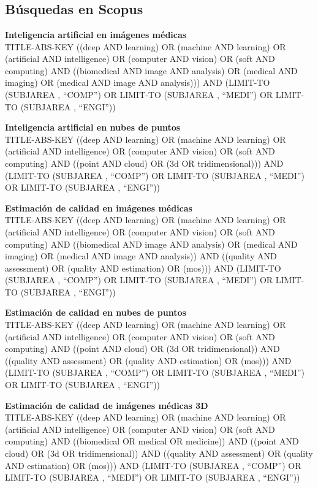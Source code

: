 \chapter*{}
\section*{Búsquedas en Scopus}
\label{subs:Scopus}
\begin{enumerate}
\item 
{\footnotesize
  \textbf{Inteligencia artificial en imágenes médicas}\\\hfill
 TITLE-ABS-KEY ((deep AND learning) OR (machine AND learning) 
 OR (artificial AND intelligence) OR (computer AND vision) 
 OR (soft AND computing) AND ((biomedical AND image AND analysis) 
 OR (medical AND imaging) OR (medical AND image AND analysis))) 
 AND (LIMIT-TO (SUBJAREA , ``COMP'') OR LIMIT-TO (SUBJAREA , ``MEDI'') 
OR LIMIT-TO (SUBJAREA , ``ENGI''))
}
{\footnotesize
 \item \textbf{Inteligencia artificial en nubes de puntos}\\\hfill
 TITLE-ABS-KEY ((deep AND learning) OR (machine AND learning) OR (artificial AND intelligence) OR (computer AND vision) OR (soft AND computing) AND ((point AND cloud) OR (3d OR tridimensional))) AND (LIMIT-TO (SUBJAREA , ``COMP'') OR LIMIT-TO (SUBJAREA , ``MEDI'') OR LIMIT-TO (SUBJAREA , ``ENGI''))
}
{\footnotesize
 \item \textbf{Estimación de calidad en imágenes médicas}\\\hfill
 TITLE-ABS-KEY ((deep AND learning) OR (machine AND learning) OR (artificial AND intelligence) OR (computer AND vision) OR (soft AND computing) AND ((biomedical AND image AND analysis) OR (medical AND imaging) OR (medical AND image AND analysis)) AND ((quality AND assessment) OR (quality AND estimation) OR (mos))) AND (LIMIT-TO (SUBJAREA , ``COMP'') OR LIMIT-TO (SUBJAREA , ``MEDI'') OR LIMIT-TO (SUBJAREA , ``ENGI'')) 
}
{\footnotesize
 \item \textbf{Estimación de calidad en nubes de puntos}\\\hfill
 TITLE-ABS-KEY ((deep AND learning) OR (machine AND learning) OR (artificial AND intelligence) OR (computer AND vision) OR (soft AND computing) AND ((point AND cloud) OR (3d OR tridimensional)) AND ((quality AND assessment) OR (quality AND estimation) OR (mos))) AND (LIMIT-TO (SUBJAREA , ``COMP'') OR LIMIT-TO (SUBJAREA , ``MEDI'') OR LIMIT-TO (SUBJAREA , ``ENGI''))
}
{\footnotesize
 \item \textbf{Estimación de calidad de imágenes médicas 3D}\\\hfill
 TITLE-ABS-KEY ((deep AND learning) OR (machine AND learning) OR (artificial AND intelligence) OR (computer AND vision) OR (soft AND computing) AND ((biomedical OR medical OR medicine)) AND ((point AND cloud) OR (3d OR tridimensional)) AND ((quality AND assessment) OR (quality AND estimation) OR (mos))) AND (LIMIT-TO (SUBJAREA , ``COMP'') OR LIMIT-TO (SUBJAREA , ``MEDI'') OR LIMIT-TO (SUBJAREA , ``ENGI''))
}
\end{enumerate}


